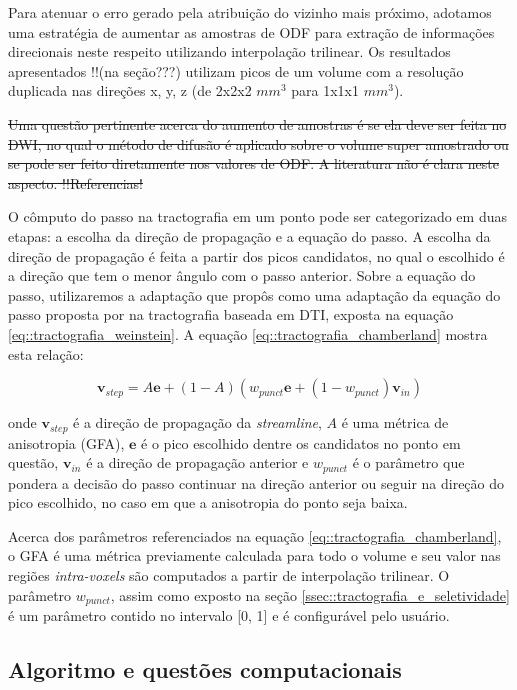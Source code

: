 \documentclass[
    12pt,                %
    oneside,            %
    a4paper,            %
    english,            %
    french,                %
    spanish,            %
    brazil                %
    ]{abntex2}
\begin{document}
Para atenuar o erro gerado pela atribuição do vizinho mais próximo, adotamos uma estratégia de aumentar as amostras de ODF para extração de informações direcionais neste respeito utilizando interpolação trilinear. Os resultados apresentados !!(na seção???) utilizam picos de um volume com a resolução duplicada nas direções x, y, z (de 2x2x2 $mm^3$ para 1x1x1 $mm^3$).

\sout{
Uma questão pertinente acerca do aumento de amostras é se ela deve ser feita no DWI, no qual o método de difusão é aplicado sobre o volume super amostrado ou se pode ser feito diretamente nos valores de ODF. A literatura não é clara neste aspecto. !!Referencias!
}

O cômputo do passo na tractografia em um ponto pode ser categorizado em duas etapas: a escolha da direção de propagação e a equação do passo. A escolha da direção de propagação é feita a partir dos picos candidatos, no qual o escolhido é a direção que tem o menor ângulo com o passo anterior. Sobre a equação do passo, utilizaremos a adaptação que  propôs como uma adaptação da equação do passo proposta por  na tractografia baseada em DTI, exposta na equação \ref{eq::tractografia_weinstein}. A equação \ref{eq::tractografia_chamberland} mostra esta relação:

\begin{equation}
\label{eq::tractografia_chamberland}
    \mathbf{v}_{step} = A\mathbf{e} + (1 - A)(w_{punct}\mathbf{e} + (1-w_{punct})\mathbf{v}_{in})
\end{equation}

onde $\mathbf{v}_{step}$ é a direção de propagação da \textit{streamline}, $A$ é uma métrica de anisotropia (GFA), $\mathbf{e}$ é o pico escolhido dentre os candidatos no ponto em questão, $\mathbf{v}_{in}$ é a direção de propagação anterior e $w_{punct}$ é o parâmetro que pondera a decisão do passo continuar na direção anterior ou seguir na direção do pico escolhido, no caso em que a anisotropia do ponto seja baixa.

Acerca dos parâmetros referenciados na equação \ref{eq::tractografia_chamberland}, o GFA é uma métrica previamente calculada para todo o volume e seu valor nas regiões \textit{intra-voxels} são computados a partir de interpolação trilinear. O parâmetro $w_{punct}$, assim como exposto na seção \ref{ssec::tractografia_e_seletividade} é um parâmetro contido no intervalo [0, 1] e é configurável pelo usuário.

\subsection{Algoritmo e questões computacionais}
\end{document}
